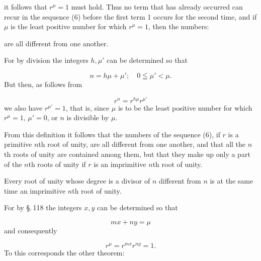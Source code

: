 it follows that $r^\mu = 1$ must hold. Thus no term that has already occurred can recur in
the sequence (6) before the first term 1 occurs for the second time, and if $\mu$ is the
least positive number for which $r^\mu = 1$, then the numbers:

are all different from one another.

 For by division the integers $h, \mu'$ can be
determined so that

\[
n = h\mu + \mu'; \quad 0 \leqq \mu' < \mu.
\]
But then, as follows from

\[
r^n = r^{h\mu} r^{\mu'}
\]
we also have $r^{\mu'} = 1$, that is, since $\mu$ is to be the least positive number for
which $r^\mu = 1$, $\mu' = 0$, or $n$ is divisible by $\mu$.



From this definition it follows that the numbers of the sequence (6), if $r$ is a
primitive $n$th root of unity, are all different from one another, and that all the
$n$th roots of unity are contained among them, but that they make up only a part of the
$n$th roots of unity if $r$ is an imprimitive $n$th root of unity.

Every root of unity whose degree is a divisor of $n$ different from $n$ is at the same
time an imprimitive $n$th root of unity.


For by \S.\,118 the integers $x, y$ can be determined so that

\[
m x + n y = \mu
\]
and consequently

\[
r^\mu = r^{mx} r^{ny} = 1.
\]
To this corresponds the other theorem:

